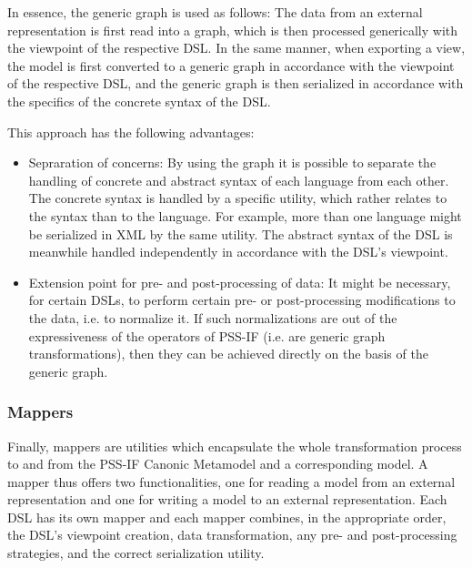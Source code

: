 In essence, the generic graph is used as follows: The data from an external representation is first read into a graph, which is then processed generically with the viewpoint of the respective DSL. In the same manner, when exporting a view, the model is first converted to a generic graph in accordance with the viewpoint of the respective DSL, and the generic graph is then serialized in accordance with the specifics of the concrete syntax of the DSL.

This approach has the following advantages:

\begin{itemize}
\item Sepraration of concerns: By using the graph it is possible to separate the handling of concrete and abstract syntax of each language from each other. The concrete syntax is handled by a specific utility, which rather relates to the syntax than to the language. For example, more than one language might be serialized in XML by the same utility. The abstract syntax of the DSL is meanwhile handled independently in accordance with the DSL's viewpoint.
\item Extension point for pre- and post-processing of data: It might be necessary, for certain DSLs, to perform certain pre- or post-processing modifications to the data, i.e. to normalize it. If such normalizations are out of the expressiveness of the operators of PSS-IF (i.e. are generic graph transformations), then they can be achieved directly on the basis of the generic graph.
\end{itemize}

\subsubsection{Mappers}

Finally, mappers are utilities which encapsulate the whole transformation process to and from the PSS-IF Canonic Metamodel and a corresponding model. A mapper thus offers two functionalities, one for reading a model from an external representation and one for writing a model to an external representation. Each DSL has its own mapper and each mapper combines, in the appropriate order, the DSL's viewpoint creation, data transformation, any pre- and post-processing strategies, and the correct serialization utility.